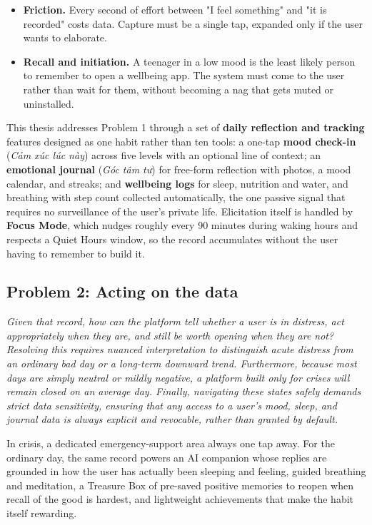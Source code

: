 \begin{itemize}
\item \textbf{Friction.} Every second of effort between "I feel something" and "it is
recorded" costs data. Capture must be a single tap, expanded only if the user wants to
elaborate.
\item \textbf{Recall and initiation.} A teenager in a low mood is the least likely person
to remember to open a wellbeing app. The system must come to the user rather than wait
for them, without becoming a nag that gets muted or uninstalled.
\end{itemize}

This thesis addresses Problem 1 through a set of \textbf{daily reflection and tracking}
features designed as one habit rather than ten tools: a one-tap \textbf{mood check-in}
(\textit{Cảm xúc lúc này}) across five levels with an optional line of context; an
\textbf{emotional journal} (\textit{Góc tâm tư}) for free-form reflection with photos, a
mood calendar, and streaks; and \textbf{wellbeing logs} for sleep, nutrition and water,
and breathing with step count collected automatically, the one passive signal that
requires no surveillance of the user's private life. Elicitation itself is handled by
\textbf{Focus Mode}, which nudges roughly every 90 minutes during waking hours and
respects a Quiet Hours window, so the record accumulates without the user having to
remember to build it.

\subsection*{Problem 2: Acting on the data}

\textit{Given that record, how can the platform tell whether a user is in distress, act appropriately when they are, and still be worth opening when they are not? Resolving this requires nuanced interpretation to distinguish acute distress from an ordinary bad day or a long-term downward trend. Furthermore, because most days are simply neutral or mildly negative, a platform built only for crises will remain closed on an average day. Finally, navigating these states safely demands strict data sensitivity, ensuring that any access to a user's mood, sleep, and journal data is always explicit and revocable, rather than granted by default.}

In crisis, a dedicated emergency-support area always one tap away. For the ordinary day, the same record powers an AI companion whose
replies are grounded in how the user has actually been sleeping and feeling, guided
breathing and meditation, a Treasure Box of pre-saved positive memories to
reopen when recall of the good is hardest, and lightweight achievements that make the
habit itself rewarding.

